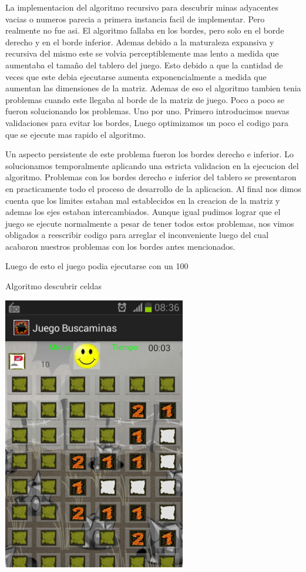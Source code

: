 \documentclass[11pt]{article} %
\begin{document}
La implementacion del algoritmo recursivo para descubrir minas adyacentes vacias o numeros parecia a primera instancia facil de implementar. Pero realmente no fue asi. El algoritmo fallaba en los bordes, pero solo en el borde derecho y en el borde inferior. 
Ademas debido a la maturaleza expansiva y recursiva del mismo este se volvia perceptiblemente mas lento a medida que aumentaba el tamaño del tablero del juego. Esto debido a que la cantidad de veces que este debia ejecutarse aumenta exponencialmente 
a medida que aumentan las dimensiones de la matriz. Ademas de eso el algoritmo tambien tenia problemas cuando este llegaba al borde de la matriz de juego. Poco a poco se fueron solucionando los problemas. Uno por uno. Primero introducimos nuevas validaciones para evitar los bordes, Luego optimizamos un poco el codigo para que se ejecute mas rapido el algoritmo.

Un aspecto persistente de este problema fueron los bordes derecho e inferior. Lo solucionamos temporalmente aplicando una estricta validacion en la ejecucion del algoritmo.
Problemas con los bordes derecho e inferior del tablero se presentaron en practicamente todo el proceso de desarrollo de la aplicacion. Al final nos dimos cuenta que los limites estaban mal establecidos en la creacion de la matriz y ademas los ejes estaban intercambiados. Aunque igual pudimos lograr que el juego se ejecute normalmente a pesar de tener todos estos problemas, nos vimos obligados a reescribir codigo para arreglar el inconveniente luego del cual acabaron nuestros problemas con los bordes antes mencionados.

Luego de esto el juego podia ejecutarse con un 100%


\begin{center}
Algoritmo descubrir celdas

\includegraphics[width=8cm]{imagenes/Screenshot_2013-12-11-08-36-13.png}
\end{center}
\end{document}
